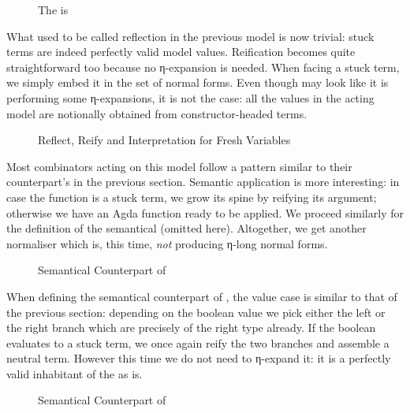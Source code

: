 \begin{figure}[h]
\caption{The  is }
\end{figure}

What used to be called reflection in the previous model is now trivial:
stuck terms are indeed perfectly valid model values. Reification becomes
quite straightforward too because no η-expansion is needed. When facing
a stuck term, we simply embed it in the set of normal forms. Even though
 may look like it is performing some η-expansions, it is not
the case: all the values in the acting model are notionally obtained
from constructor-headed terms.

\begin{figure}[h]
\caption{Reflect, Reify and Interpretation for Fresh Variables}
\end{figure}

Most combinators acting on this model follow a pattern similar to their
counterpart's in the previous section. Semantic application is
more interesting: in case the function is a stuck term, we grow its
spine by reifying its argument; otherwise we have an Agda function ready
to be applied. We proceed similarly for the definition of the semantical
 (omitted here). Altogether, we get another
normaliser which is, this time, \emph{not} producing η-long normal forms.

\begin{figure}[h]
\caption{Semantical Counterpart of }
\end{figure}

When defining the semantical counterpart of , the value case is similar to
that of the previous section: depending on the boolean value we pick either the left
or the right branch which are precisely of the right type already. If the boolean
evaluates to a stuck term, we once again reify the two branches and assemble a neutral
term. However this time we do not need to η-expand it: it is a perfectly valid inhabitant
of the  as is.

\begin{figure}[h]
\caption{Semantical Counterpart of }
\end{figure}


